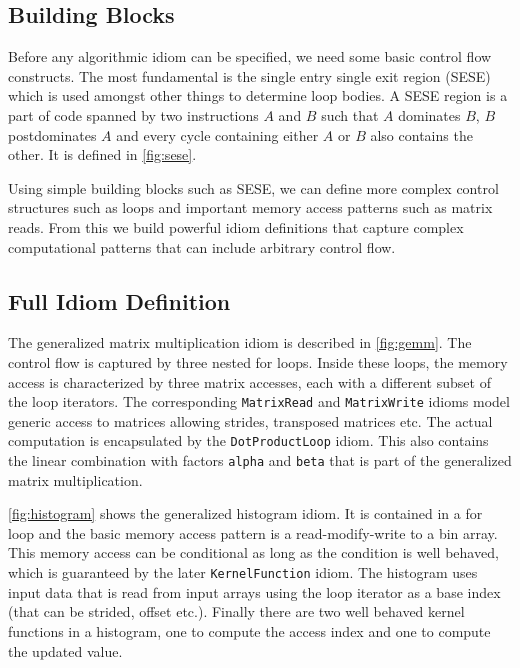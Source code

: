 \subsection{Building Blocks}

    Before any algorithmic idiom can be specified, we need some basic control
    flow constructs.
    The most fundamental is the single entry single exit region (SESE)
    \cite{johnson1994program} which is used amongst other things to determine
    loop bodies.
    A SESE region is a part of code spanned by two instructions $A$ and $B$ such
    that $A$ dominates $B$, $B$ postdominates $A$ and every cycle containing
    either $A$ or $B$ also contains the other.
    It is defined in \autoref{fig:sese}.

    Using simple building blocks such as SESE, we can define more complex
    control structures such as loops and important memory access patterns such
    as matrix reads.
    From this we build powerful idiom definitions that capture complex
    computational patterns that can include arbitrary control flow.

\subsection{Full Idiom Definition}

    The generalized matrix multiplication idiom is described in
    \autoref{fig:gemm}.
    The control flow is captured by three nested for loops.
    Inside these loops, the memory access is characterized by three matrix
    accesses, each with a different subset of the loop iterators.
    The corresponding \texttt{MatrixRead} and \texttt{MatrixWrite} idioms model
    generic access to matrices allowing strides, transposed matrices etc.
    The actual computation is encapsulated by the \texttt{DotProductLoop} idiom.
    This also contains the linear combination with factors \texttt{alpha} and
    \texttt{beta} that is part of the generalized matrix multiplication.

\autoref{fig:histogram} shows the generalized histogram idiom.
It is contained in a for loop and the basic memory access pattern is a read-modify-write to a bin array.
This memory access can be conditional as long as the condition is well behaved, which is guaranteed by the later
\texttt{KernelFunction} idiom.
The histogram uses input data that is read from input arrays using the loop iterator as a base index (that can be
strided, offset etc.).
Finally there are two well behaved kernel functions in a histogram, one to compute the access index and one to compute
the updated value.

